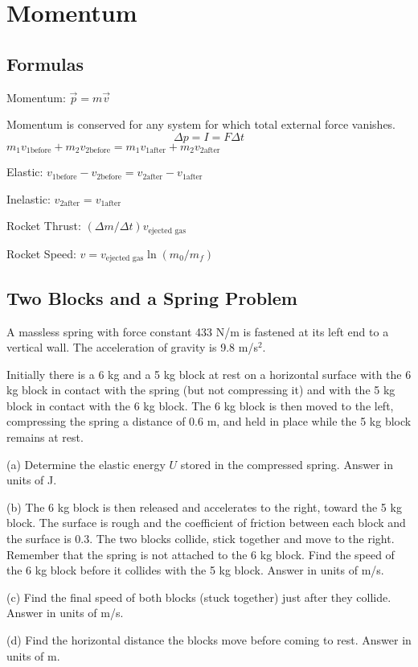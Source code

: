 \documentclass[../physics12.tex]{subfiles}
\begin{document}
\chapter{Momentum}
\section{Formulas}
Momentum: $\vec{p}=m\vec{v}$

Momentum is conserved for any system for which total external force vanishes.
\[ \Delta p = I = F\Delta t \]
$m_1v_{1\text{before}} + m_2v_{2\text{before}}=m_1v_{1\text{after}}+m_2v_{2\text{after}}$

Elastic: $v_{1\text{before}}-v_{2\text{before}}=v_{2\text{after}}-v_{1\text{after}}$

Inelastic: $v_{2\text{after}}=v_{1\text{after}}$

Rocket Thrust: $(\Delta m/\Delta t)v_{\text{ejected gas}}$

Rocket Speed: $v=v_{\text{ejected gas}}\ln(m_0/m_f)$

\section{Two Blocks and a Spring Problem}
A massless spring with force constant 433 N/m is fastened at its left end to a vertical wall.
The acceleration of gravity is 9.8 m/s$^2$.

Initially there is a 6 kg and a 5 kg block at rest on a horizontal surface with the 6 kg block in contact with the spring 
(but not compressing it) and with the 5 kg block in contact with the 6 kg block. The 6 kg block is then moved to the left, compressing the spring 
a distance of 0.6 m, and held in place while the 5 kg block remains at rest.

(a) Determine the elastic energy $U$ stored in the compressed spring.
Answer in units of J.

(b) The 6 kg block is then released and accelerates to the right, toward the 5 kg block. The surface is rough and the coefficient of friction 
between each block and the surface is 0.3. The two blocks collide, stick together and move to the right. Remember that the spring is not attached to the 6 kg block. 
Find the speed of the 6 kg block before it collides with the 5 kg block. Answer in units of m/s.

(c) Find the final speed of both blocks (stuck together) just after they collide. Answer in units of m/s.

(d) Find the horizontal distance the blocks move before coming to rest. Answer in units of m.
\end{document}
